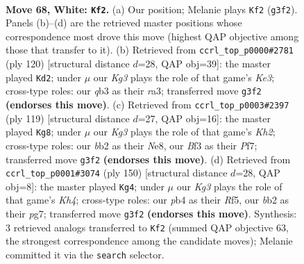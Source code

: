 \documentclass[11pt]{article}
\begin{document}
\clearpage

\begin{figure}[p]\centering
\begin{subfigure}{0.46\textwidth}\centering
\resizebox{\linewidth}{!}{%
\newchessgame
\chessboard[
  setfen={8/8/8/7R/1p1k4/1q3BK1/1b6/8 w - - 26 68},
  showmover=false,
  pgfstyle=straightmove, color=movearrow, markmove={g3-f2}
]}
\caption{}
\end{subfigure}\hfill
\begin{subfigure}{0.46\textwidth}\centering
\resizebox{\linewidth}{!}{%
\newchessgame
\chessboard[
  setfen={8/7R/8/2k5/8/r2BK3/b7/8 w - - 0 61},
  showmover=false,
  pgfstyle=straightmove, color=movearrow, markmove={e3-d2}
]}
\caption{}
\end{subfigure}
\\[4pt]
\begin{subfigure}{0.46\textwidth}\centering
\resizebox{\linewidth}{!}{%
\newchessgame
\chessboard[
  setfen={4n3/5p1k/4r3/7Q/7P/5K2/8/8 b - - 2 60},
  showmover=false,
  pgfstyle=straightmove, color=movearrow, markmove={h7-g8}
]}
\caption{}
\end{subfigure}\hfill
\begin{subfigure}{0.46\textwidth}\centering
\resizebox{\linewidth}{!}{%
\newchessgame
\chessboard[
  setfen={6k1/6p1/8/5R2/4qB1K/8/3R4/8 w - - 21 76},
  showmover=false,
  pgfstyle=straightmove, color=movearrow, markmove={h4-g4}
]}
\caption{}
\end{subfigure}
\caption{\textbf{Move 68, White: \texttt{Kf2}.} (a) Our position; Melanie plays \texttt{Kf2} (\texttt{g3f2}). Panels (b)--(d) are the retrieved master positions whose correspondence most drove this move (highest QAP objective among those that transfer to it). (b) Retrieved from \texttt{ccrl\_top\_p0000\#2781} (ply 120) [structural distance $d$=28, QAP obj=39]: the master played \texttt{Kd2}; under $\mu$ our \emph{Kg3} plays the role of that game's \emph{Ke3}; cross-type roles: our \emph{q}b3 as their \emph{r}a3; transferred move \texttt{g3f2} \textbf{(endorses this move)}. (c) Retrieved from \texttt{ccrl\_top\_p0003\#2397} (ply 119) [structural distance $d$=27, QAP obj=16]: the master played \texttt{Kg8}; under $\mu$ our \emph{Kg3} plays the role of that game's \emph{Kh2}; cross-type roles: our \emph{b}b2 as their \emph{N}e8, our \emph{B}f3 as their \emph{P}f7; transferred move \texttt{g3f2} \textbf{(endorses this move)}. (d) Retrieved from \texttt{ccrl\_top\_p0001\#3074} (ply 150) [structural distance $d$=28, QAP obj=8]: the master played \texttt{Kg4}; under $\mu$ our \emph{Kg3} plays the role of that game's \emph{Kh4}; cross-type roles: our \emph{p}b4 as their \emph{R}f5, our \emph{b}b2 as their \emph{p}g7; transferred move \texttt{g3f2} \textbf{(endorses this move)}. Synthesis: 3 retrieved analogs transferred to \texttt{Kf2} (summed QAP objective 63, the strongest correspondence among the candidate moves); Melanie committed it via the \texttt{search} selector.}
\label{fig:thought-m134}
\end{figure}
\end{document}
